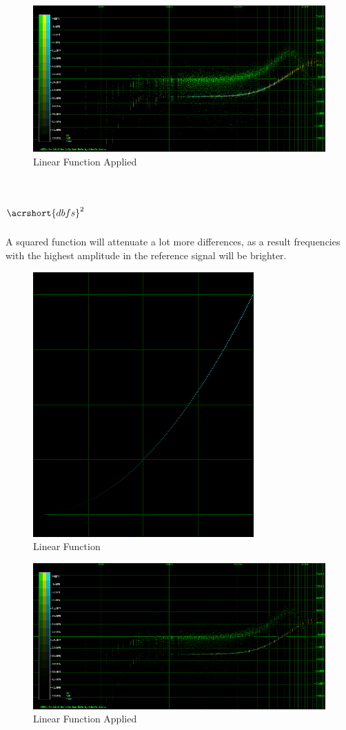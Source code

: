 \documentclass[10pt,a4paper]{report}
\begin{document}
\begin{appendices}
\begin{figure}[H]
	\centering
	\includegraphics[width=1\linewidth]{images/colorfilter/BetaFunctionPlot_3_Data.png}
	\caption[Linear Applied]{Linear Function Applied}
	\label{fig:betafunctionplot3data}
\end{figure}

\section{$\acrshort{dbfs}^2$}

A squared function will attenuate a lot more differences, as a result frequencies with the highest amplitude in the reference signal will be brighter.

\begin{figure}[H]
	\centering
	\includegraphics[width=0.4\linewidth]{images/colorfilter/BetaFunctionPlot_4.png}
	\caption[Linear]{Linear Function}
	\label{fig:betafunctionplot4}
\end{figure}

\begin{figure}[H]
	\centering
	\includegraphics[width=1\linewidth]{images/colorfilter/BetaFunctionPlot_4_Data.png}
	\caption[Linear Applied]{Linear Function Applied}
	\label{fig:betafunctionplot4data}
\end{figure}


\end{appendices}
\end{document}
